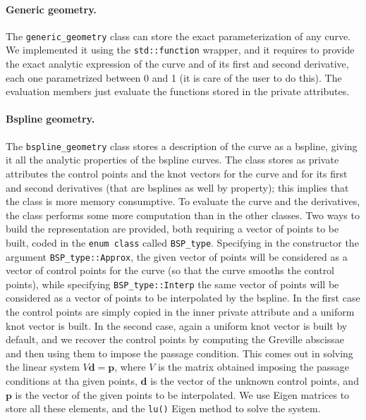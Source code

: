 \documentclass[10pt]{article} %
\newcommand{\classname}[1]{\texttt{#1}}
\begin{document}
	\paragraph{Generic geometry.} The \classname{generic\_geometry} class can store the exact parameterization of any curve. We implemented it using the \texttt{std::function} wrapper, and it requires to provide the exact analytic expression of the curve and of its first and second derivative, each one parametrized between 0 and 1 (it is care of the user to do this). The evaluation members just evaluate the functions stored in the private attributes.
	\paragraph{Bspline geometry.} The \classname{bspline\_geometry} class stores a description of the curve as a bspline, giving it all the analytic properties of the bspline curves. The class stores as private attributes the control points and the knot vectors for the curve and for its first and second derivatives (that are bsplines as well by property); this implies that the class is more memory consumptive. To evaluate the curve and the derivatives, the class performs some more computation than in the other classes. \newline	
	Two ways to build the representation are provided, both requiring a vector of points to be built, coded in the \texttt{enum class} called \texttt{BSP\_type}. Specifying in the constructor the argument \texttt{BSP\_type::Approx}, the given vector of points will be considered as a vector of control points for the curve (so that the curve smooths the control points), while specifying \texttt{BSP\_type::Interp} the same vector of points will be considered as a vector of points to be interpolated by the bspline. In the first case the control points are simply copied in the inner private attribute and a uniform knot vector is built. In the second case, again a uniform knot vector is built by default, and we recover the control points by computing the Greville abscissae and then using them to impose the passage condition. This comes out in solving the linear system $V \mathbf{d} = \mathbf{p}$, where $V$ is the matrix obtained imposing the passage conditions at tha given points, $\mathbf{d}$ is the vector of the unknown control points, and $\mathbf{p}$ is the vector of the given points to be interpolated. We use Eigen matrices to store all these elements, and the \texttt{lu()} Eigen method to solve the system.
	
\end{document}
